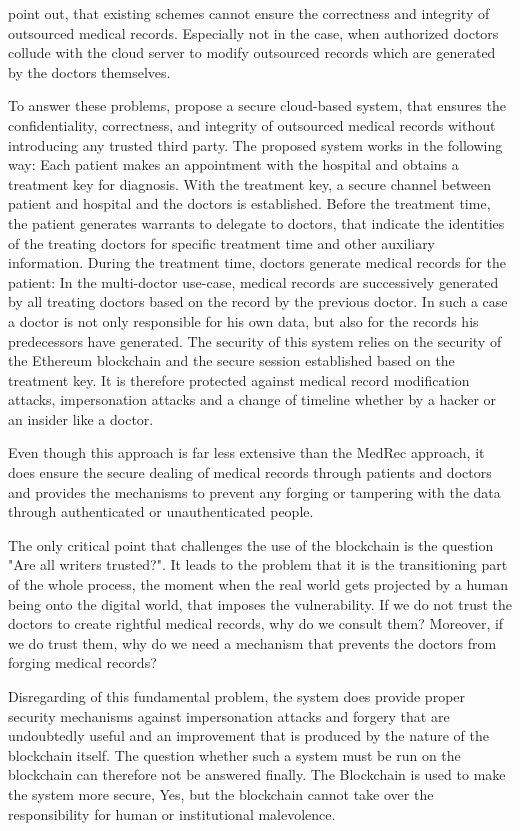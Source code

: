 \citeauthor{Cao2019} point out, that existing schemes cannot ensure the correctness and integrity of outsourced medical records. Especially not in the case, when authorized doctors collude with the cloud server to modify outsourced records which are generated by the doctors themselves.

To answer these problems, \citeauthor{Cao2019} propose a secure cloud-based system, that ensures the confidentiality, correctness, and integrity of outsourced medical records without introducing any trusted third party.
The proposed system works in the following way: Each patient makes an appointment with the hospital and obtains a treatment key for diagnosis. With the treatment key, a secure channel between patient and hospital and the doctors is established.
Before the treatment time, the patient generates warrants to delegate to doctors, that indicate the identities of the treating doctors for specific treatment time and other auxiliary information.
During the treatment time, doctors generate medical records for the patient: In the multi-doctor use-case, medical records are successively generated by all treating doctors based on the record by the previous doctor. In such a case a doctor is not only responsible for his own data, but also for the records his predecessors have generated.
The security of this system relies on the security of the Ethereum blockchain and the secure session established based on the treatment key. It is therefore protected against medical record modification attacks, impersonation attacks and a change of timeline whether by a hacker or an insider like a doctor.

Even though this approach is far less extensive than the MedRec approach, it does ensure the secure dealing of medical records through patients and doctors and provides the mechanisms to prevent any forging or tampering with the data through authenticated or unauthenticated people.

The only critical point that challenges the use of the blockchain is the question "Are all writers trusted?"\cite{Wust2017}. It leads to the  problem that it is the transitioning part of the whole process, the moment when the real world gets projected by a human being onto the digital world, that imposes the vulnerability.
If we do not trust the doctors to create rightful medical records, why do we consult them? Moreover, if we do trust them, why do we need a mechanism that prevents the doctors from forging medical records?

Disregarding of this fundamental problem, the system does provide proper security mechanisms against impersonation attacks and forgery that are undoubtedly useful and an improvement that is produced by the nature of the blockchain itself.
The question whether such a system must be run on the blockchain can therefore not be answered finally. The Blockchain is used to make the system more secure, Yes, but the blockchain cannot take over the responsibility for human or institutional malevolence.



